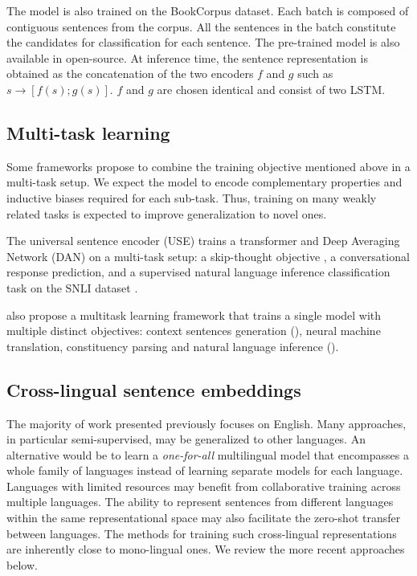 
The model is also trained on the BookCorpus dataset. Each batch is composed of contiguous sentences from the corpus. All the sentences in the batch constitute the candidates for classification for each sentence. The pre-trained model is also available in open-source. At inference time, the sentence representation is obtained as the concatenation of the two encoders $f$ and $g$ such as $s \rightarrow [f(s);g(s)]$. $f$ and $g$ are chosen identical and consist of two LSTM. 


\subsection{Multi-task learning}

Some frameworks propose to combine the training objective mentioned above in a multi-task setup. We expect the model to encode complementary properties and inductive biases required for each sub-task. Thus, training on many weakly related tasks is expected to improve generalization to novel ones.

The universal sentence encoder (USE) \parencite{cer_18} trains a transformer and Deep Averaging Network (DAN) on a multi-task setup: a skip-thought objective \parencite{kiros_15}, a conversational response prediction, and a supervised natural language inference classification task on the SNLI dataset \parencite{bowman_15, conneau_17}.

\textcite{subramanian_18} also propose a multitask learning framework that trains a single model with multiple distinct objectives: context sentences generation (), neural machine translation, constituency parsing and natural language inference ().

\subsection{Cross-lingual sentence embeddings}

The majority of work presented previously focuses on English. Many approaches, in particular semi-supervised, may be generalized to other languages. An alternative would be to learn a \textit{one-for-all} multilingual model that encompasses a whole family of languages instead of learning separate models for each language. Languages with limited resources may benefit from collaborative training across multiple languages. The ability to represent sentences from different languages within the same representational space may also facilitate the zero-shot transfer between languages. The methods for training such cross-lingual representations are inherently close to mono-lingual ones. We review the more recent approaches below.

